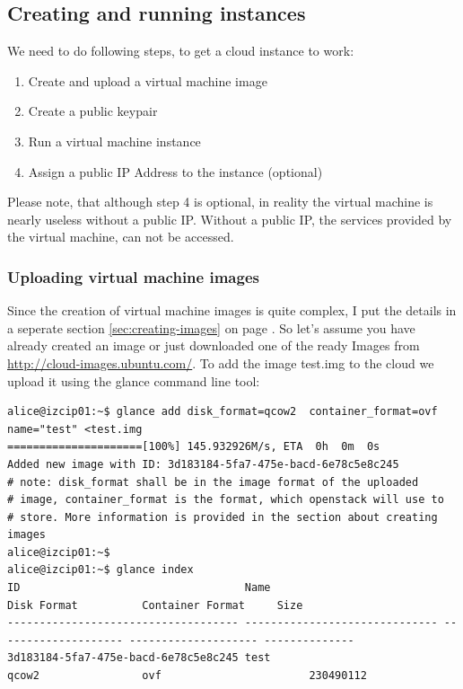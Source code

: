 \documentclass[a4paper,bibtotoc,english,liststotoc]{scrartcl}
\begin{document}
\subsection{Creating and running instances}
\label{sec:creat-runn-inst}
We need to do following steps, to get a cloud instance to work:
\begin{enumerate}
\item Create and upload a virtual machine image
\item Create a public keypair
\item Run a virtual machine instance
\item Assign a public IP Address to the instance (optional)
\end{enumerate}
Please note, that although step 4 is optional, in reality the virtual machine is nearly useless without
a public IP. Without a public IP, the services provided by the virtual
machine, can not be accessed. 

\subsubsection{Uploading virtual machine images}
\label{sec:create-uplo-virt}
Since the creation of virtual machine images is quite complex, I put
the details in a seperate section \ref{sec:creating-images} on page
\pageref{sec:creating-images}. So let's assume you have already created an
image or just downloaded one of the ready Images from
\url{http://cloud-images.ubuntu.com/}. 
To add the image test.img to the cloud we upload it using the glance
command line tool:
\begin{verbatim}
alice@izcip01:~$ glance add disk_format=qcow2  container_format=ovf name="test" <test.img
=====================[100%] 145.932926M/s, ETA  0h  0m  0s
Added new image with ID: 3d183184-5fa7-475e-bacd-6e78c5e8c245
# note: disk_format shall be in the image format of the uploaded
# image, container_format is the format, which openstack will use to
# store. More information is provided in the section about creating images
alice@izcip01:~$
alice@izcip01:~$ glance index 
ID                                   Name                           Disk Format          Container Format     Size          
------------------------------------ ------------------------------ -------------------- -------------------- --------------
3d183184-5fa7-475e-bacd-6e78c5e8c245 test                            qcow2                ovf                       230490112
\end{verbatim}
\end{document}
